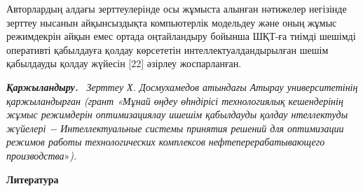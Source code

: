 Авторлардың алдағы зерттеулерінде осы жұмыста алынған нәтижелер
негізінде зерттеу нысанын айқынсыздықта компьютерлік модельдеу және оның
жұмыс режимдекрін айқын емес ортада оңтайландыру бойынша ШҚТ-ға тиімді
шешімді оперативті қабылдауға қолдау көрсететін интеллектуалдандырылған
шешім қабылдауды қолдау жүйесін {[}22{]} әзірлеу жоспарланған.

\emph{{\bfseries Қаржыландыру.}} ~\emph{Зерттеу Х. Досмухамедов атындағы
Атырау университетінің қаржыландырған (грант «Мұнай өңдеу өһндірісі
технологиялық кешендерінің жұмыс режимдерін оптимизациялау ишешім
қабылдауды қолдау нтеллектуды жүйелері − Интеллектуальные системы
принятия решений для оптимизации режимов работы технологических
комплексов нефтеперерабатывающего производства}»\emph{).}


\begin{center}
	{\bfseries Литература}
	\end{center}

